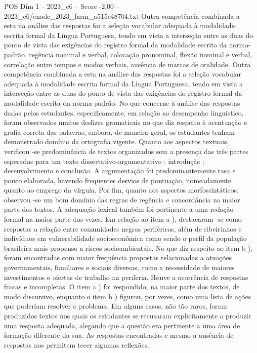 \begin{textsample}{POS Dim 1 – 2023\_c6 – Score -2.00 – 2023\_c6/enade\_2023\_farm\_a515e48704.txt}
Outra competência combinada a esta na análise das respostas foi a seleção vocabular adequada à modalidade escrita formal da Língua Portuguesa, tendo em vista a interseção entre as duas do ponto de vista das exigências do registro formal da modalidade escrita da norma-padrão. regência nominal e verbal, colocação pronominal, flexão nominal e verbal, correlação entre tempos e modos verbais, ausência de marcas de oralidade.
Outra competência combinada a esta na análise das respostas foi a seleção vocabular adequada à modalidade escrita formal da Língua Portuguesa, tendo em vista a interseção entre as duas do ponto de vista das exigências do registro formal da modalidade escrita da norma-padrão.
No que concerne à análise das respostas dadas pelos estudantes, especificamente, em relação ao desempenho linguístico, foram observados muitos deslizes gramaticais no que diz respeito à acentuação e grafia correta das palavras, embora, de maneira geral, os estudantes tenham demonstrado domínio da ortografia vigente.
Quanto aos aspectos textuais, verificou -se predominância de textos organizados sem a presença das três partes esperadas para um texto dissertativo-argumentativo : introdução ; desenvolvimento e conclusão.
A argumentação foi predominantemente rasa e pouco elaborada, havendo frequentes desvios de pontuação, nomeadamente quanto ao emprego da vírgula.
Por fim, quanto aos aspectos morfossintáticos, observou -se um bom domínio das regras de regência e concordância na maior parte dos textos.
A adequação lexical também foi pertinente a uma redação formal na maior parte das vezes.
Em relação ao item a ), destacaram -se como respostas a relação entre comunidades negras periféricas, além de ribeirinhos e indivíduos em vulnerabilidade socioeconômica como sendo o perfil da população brasileira mais propenso a riscos socioambientais.
No que diz respeito ao item b ), foram encontradas com maior frequência propostas relacionadas a atuações governamentais, familiares e sociais diversas, como a necessidade de maiores investimentos e ofertas de trabalho na periferia.
Houve a ocorrência de respostas fracas e incompletas.
O item a ) foi respondido, na maior parte dos textos, de modo discursivo, enquanto o item b ) figurou, por vezes, como uma lista de ações que poderiam resolver o problema.
Em alguns casos, não tão raros, foram produzidos textos nos quais os estudantes se recusaram explicitamente a produzir uma resposta adequada, alegando que a questão era pertinente a uma área de formação diferente da sua.
As respostas encontradas e mesmo a ausência de respostas nos permitem tecer algumas reflexões.

\end{textsample}
